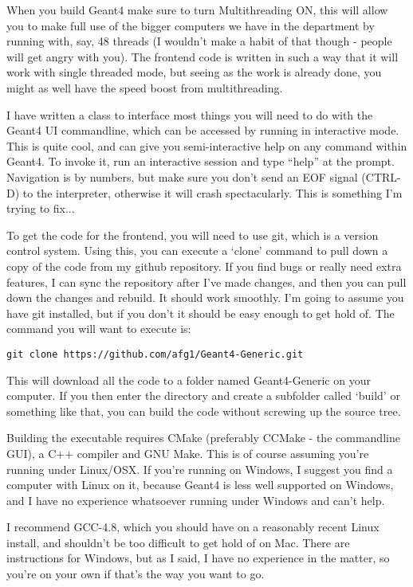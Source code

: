 \documentclass{article}
\begin{document}
When you build Geant4 make sure to turn Multithreading ON, this will allow you to make full use of the bigger computers we have in the department by running with, say, 48 threads (I wouldn't make a habit of that though - people will get angry with you). The frontend code is written in such a way that it will work with single threaded mode, but seeing as the work is already done, you might as well have the speed boost from multithreading.

I have written a class to interface most things you will need to do with the Geant4 UI commandline, which can be accessed by running in interactive mode. This is quite cool, and can give you semi-interactive help on any command within Geant4. To invoke it, run an interactive session and type ``help'' at the prompt. Navigation is by numbers, but make sure you don't send an EOF signal (CTRL-D) to the interpreter, otherwise it will crash spectacularly. This is something I'm trying to fix...

To get the code for the frontend, you will need to use git, which is a version control system. Using this, you can execute a `clone' command to pull down a copy of the code from my github repository. If you find bugs or really need extra features, I can sync the repository after I've made changes, and then you can pull down the changes and rebuild. It should work smoothly. I'm going to assume you have git installed, but if you don't it should be easy enough to get hold of. The command you will want to execute is:
\begin{verbatim}
git clone https://github.com/afg1/Geant4-Generic.git
\end{verbatim}
This will download all the code to a folder named Geant4-Generic on your computer. If you then enter the directory and create a subfolder called `build' or something like that, you can build the code without screwing up the source tree.

Building the executable requires CMake (preferably CCMake - the commandline GUI), a C++ compiler and GNU Make. This is of course assuming you're running under Linux/OSX. If you're running on Windows, I suggest you find a computer with Linux on it, because Geant4 is less well supported on Windows, and I have no experience whatsoever running under Windows and can't help.

I recommend GCC-4.8, which you should have on a reasonably recent Linux install, and shouldn't be too difficult to get hold of on Mac. There are instructions for Windows, but as I said, I have no experience in the matter, so you're on your own if that's the way you want to go.
\end{document}
